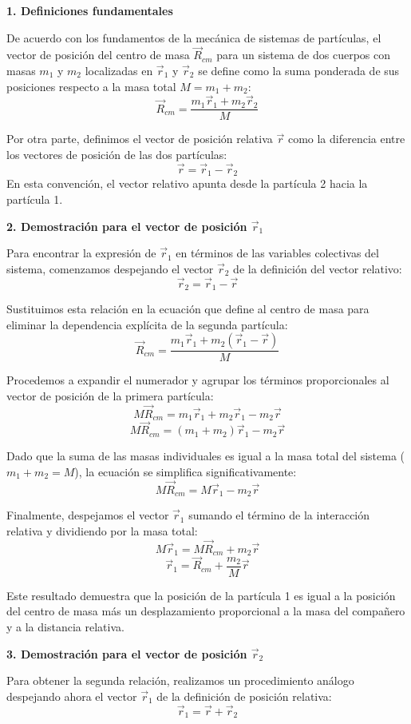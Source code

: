 \documentclass[a4paper]{article}
\begin{document}
\textbf{1. Definiciones fundamentales}

De acuerdo con los fundamentos de la mecánica de sistemas de partículas, el vector de posición del centro de masa $\vec{R}_{cm}$ para un sistema de dos cuerpos con masas $m_1$ y $m_2$ localizadas en $\vec{r}_1$ y $\vec{r}_2$ se define como la suma ponderada de sus posiciones respecto a la masa total $M = m_1 + m_2$:
$$ \vec{R}_{cm} = \frac{m_1\vec{r}_1 + m_2\vec{r}_2}{M} $$

Por otra parte, definimos el vector de posición relativa $\vec{r}$ como la diferencia entre los vectores de posición de las dos partículas:
$$ \vec{r} = \vec{r}_1 - \vec{r}_2 $$
En esta convención, el vector relativo apunta desde la partícula 2 hacia la partícula 1.

\textbf{2. Demostración para el vector de posición $\vec{r}_1$}

Para encontrar la expresión de $\vec{r}_1$ en términos de las variables colectivas del sistema, comenzamos despejando el vector $\vec{r}_2$ de la definición del vector relativo:
$$ \vec{r}_2 = \vec{r}_1 - \vec{r} $$

Sustituimos esta relación en la ecuación que define al centro de masa para eliminar la dependencia explícita de la segunda partícula:
$$ \vec{R}_{cm} = \frac{m_1\vec{r}_1 + m_2(\vec{r}_1 - \vec{r})}{M} $$

Procedemos a expandir el numerador y agrupar los términos proporcionales al vector de posición de la primera partícula:
$$ M\vec{R}_{cm} = m_1\vec{r}_1 + m_2\vec{r}_1 - m_2\vec{r} $$
$$ M\vec{R}_{cm} = (m_1 + m_2)\vec{r}_1 - m_2\vec{r} $$

Dado que la suma de las masas individuales es igual a la masa total del sistema ($m_1 + m_2 = M$), la ecuación se simplifica significativamente:
$$ M\vec{R}_{cm} = M\vec{r}_1 - m_2\vec{r} $$

Finalmente, despejamos el vector $\vec{r}_1$ sumando el término de la interacción relativa y dividiendo por la masa total:
$$ M\vec{r}_1 = M\vec{R}_{cm} + m_2\vec{r} $$
$$ \vec{r}_1 = \vec{R}_{cm} + \frac{m_2}{M}\vec{r} $$

Este resultado demuestra que la posición de la partícula 1 es igual a la posición del centro de masa más un desplazamiento proporcional a la masa del compañero y a la distancia relativa.

\textbf{3. Demostración para el vector de posición $\vec{r}_2$}

Para obtener la segunda relación, realizamos un procedimiento análogo despejando ahora el vector $\vec{r}_1$ de la definición de posición relativa:
$$ \vec{r}_1 = \vec{r} + \vec{r}_2 $$
\end{document}
